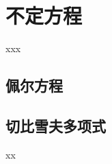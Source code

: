 \chapter{不定方程}

\begin{introduction}
	\item xxx
\end{introduction}

\section{佩尔方程}


\section{切比雪夫多项式}


\begin{problemset}
	\item xx
\end{problemset}